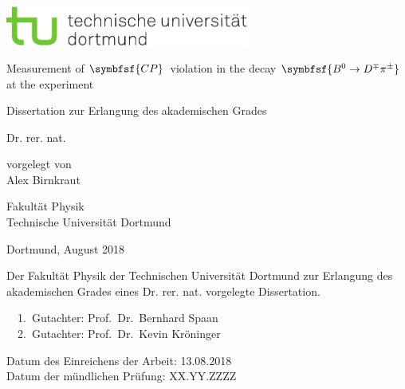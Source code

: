 
\begin{titlepage}
\includegraphics[width=8cm]{tud-logo-cmyk.pdf}
\vspace*{15ex}
{%
\Huge \sffamily \bfseries
\begin{center}
Measurement of $\symbfsf{C{}P}$\, violation in the decay $\symbfsf{\Bz\to D^\mp\pi^\pm}$ at the \lhcb experiment
\end{center}
}%

\begin{otherlanguage}{german}
{%
\LARGE \sffamily %
\begin{center}
Dissertation zur Erlangung des akademischen Grades\\
\end{center}
}

{%
\LARGE \sffamily %
\begin{center}
Dr. rer. nat.
\end{center}
}

\vspace{5ex}


{%
\Large \sffamily
\begin{center}
vorgelegt von \\[0.8ex]
Alex Birnkraut
\end{center}
}
\vspace{5ex}
{%
\Large \sffamily
\begin{center}
Fakultät Physik\\
Technische Universität Dortmund
\end{center}
}
\vspace{4ex}
{%
\Large \sffamily
\begin{center}
Dortmund, August 2018
\end{center}
}

\clearpage
\thispagestyle{empty}
\vspace*{\fill}
\noindent Der Fakultät Physik der Technischen Universität Dortmund zur Erlangung
des akademischen Grades eines Dr. rer. nat. vorgelegte
Dissertation.\\

\parbox{\textwidth}{
  1.~Gutachter: Prof.~Dr.~Bernhard Spaan \\
  2.~Gutachter: Prof.~Dr.~Kevin Kröninger\\
}
\noindent Datum des Einreichens der Arbeit: 13.08.2018\\
\noindent Datum der mündlichen Prüfung: XX.YY.ZZZZ
\end{otherlanguage}
\end{titlepage}
\setcounter{page}{1}
